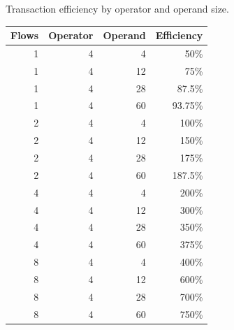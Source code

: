 \documentclass[../HFT-main.tex]{subfiles}
\begin{document}
\begin{margintable}
\caption{Transaction efficiency by operator and operand size.}
\label{tab:txn-efficiency}

\hspace*{-1.0em}%

\footnotesize            %
\setlength{\tabcolsep}{3pt} %
\hspace{-8pt}
\begin{tabular}{@{}r r r r@{}}
\toprule
Flows & Operator & Operand & Efficiency \\ \midrule
1 & 4 & 4  & 50\%   \\
1 & 4 & 12 & 75\%   \\
1 & 4 & 28 & 87.5\% \\
1 & 4 & 60 & 93.75\%\\
2 & 4 & 4  & 100\%  \\
2 & 4 & 12 & 150\%  \\
2 & 4 & 28 & 175\%  \\
2 & 4 & 60 & 187.5\%\\
4 & 4 & 4  & 200\%  \\
4 & 4 & 12 & 300\%  \\
4 & 4 & 28 & 350\%  \\
4 & 4 & 60 & 375\%  \\
8 & 4 & 4  & 400\%  \\
8 & 4 & 12 & 600\%  \\
8 & 4 & 28 & 700\%  \\
8 & 4 & 60 & 750\%  \\ \bottomrule
\end{tabular}
\end{margintable}






\end{document}
